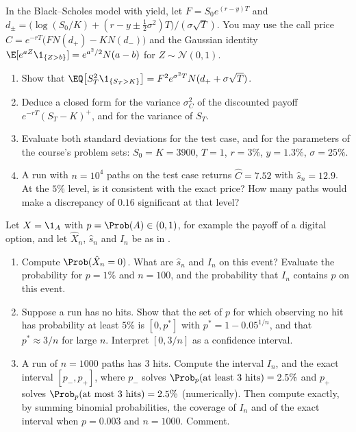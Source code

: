 
\begin{exercise}\label{ex:mc-call-variance}
\easy In the Black--Scholes model with yield, let $F=S_0e^{(r-y)T}$ and
$d_\pm=\big(\log(S_0/K)+(r-y\pm\frac12\sigma^2)T\big)/(\sigma\sqrt T)$. You may use the call
price $C=e^{-rT}\big(FN(d_+)-KN(d_-)\big)$ and the Gaussian identity
$\E[e^{aZ}\1_{\{Z>b\}}]=e^{a^2/2}N(a-b)$ for $Z\sim\mathcal N(0,1)$.
\begin{enumerate}[label=(\alph*)]
  \item Show that $\EQ\big[S_T^2\1_{\{S_T>K\}}\big]=F^2e^{\sigma^2T}N(d_++\sigma\sqrt T)$.
  \item Deduce a closed form for the variance $\sigma_C^2$ of the discounted payoff
    $e^{-rT}(S_T-K)^+$, and for the variance of $S_T$.
  \item Evaluate both standard deviations for the test case, and for the parameters of the
    course's problem sets: $S_0=K=3900$, $T=1$, $r=3\%$, $y=1.3\%$, $\sigma=25\%$.
  \item A run with $n=10^4$ paths on the test case returns $\hat C=7.52$ with $\hat s_n=12.9$.
    At the $5\%$ level, is it consistent with the exact price? How many paths would make a
    discrepancy of $0.16$ significant at that level?
\end{enumerate}
\end{exercise}

\begin{exercise}\label{ex:mc-zero-hits}
\easy Let $X=\1_A$ with $p=\Prob(A)\in(0,1)$, for example the payoff of a digital option,
and let $\hat X_n$, $\hat s_n$ and $I_n$ be as in .
\begin{enumerate}[label=(\alph*)]
  \item Compute $\Prob(\hat X_n=0)$. What are $\hat s_n$ and $I_n$ on this event? Evaluate
    the probability for $p=1\%$ and $n=100$, and the probability that $I_n$ contains $p$
    on this event.
  \item Suppose a run has no hits. Show that the set of $p$ for which observing no hit has
    probability at least $5\%$ is $[0,p^*]$ with $p^*=1-0.05^{1/n}$, and that
    $p^*\approx3/n$ for large $n$. Interpret $[0,3/n]$ as a confidence interval.
  \item A run of $n=1000$ paths has $3$ hits. Compute the interval $I_n$, and the exact
    interval $[p_-,p_+]$, where $p_-$ solves $\Prob_{p}(\text{at least }3\text{ hits})=2.5\%$
    and $p_+$ solves $\Prob_{p}(\text{at most }3\text{ hits})=2.5\%$ (numerically). Then compute
    exactly, by summing binomial probabilities, the coverage of $I_n$ and of the exact
    interval when $p=0.003$ and $n=1000$. Comment.
\end{enumerate}
\end{exercise}

